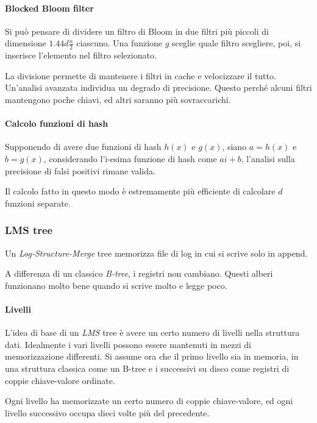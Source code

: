 \paragraph{Blocked Bloom filter}
Si può pensare di dividere un filtro di Bloom in due filtri più piccoli di dimensione $1.44d\frac{n}{2}$ ciascuno.
Una funzione $g$ sceglie quale filtro scegliere, poi, si inserisce l'elemento nel filtro selezionato.

La divisione permette di mantenere i filtri in cache e velocizzare il tutto. 
Un'analisi avanzata individua un degrado di precisione. Questo perché alcuni filtri 
mantengono poche chiavi, ed altri saranno più sovraccarichi.

\paragraph{Calcolo funzioni di hash}
Supponendo di avere due funzioni di hash $h(x)$ e $g(x)$, siano $a = h(x)$ e 
$b = g(x)$, considerando l'i-esima funzione di hash come $ai + b$, 
l'analisi sulla precisione di falsi positivi rimane valida. 
\begin{remark}
    Il calcolo fatto in questo modo è estremamente più efficiente di calcolare 
    $d$ funzioni separate. 
\end{remark}

\subsubsection{LMS tree}
Un \emph{Log-Structure-Merge} tree memorizza file di log in cui si scrive solo in append. 

A differenza di un classico \emph{B-tree}, i registri non cambiano.
Questi alberi funzionano molto bene quando si scrive molto e legge poco.

\paragraph{Livelli}
L'idea di base di un \emph{LMS} tree è avere un certo numero di livelli nella struttura 
dati. Idealmente i vari livelli possono essere mantenuti in mezzi di memorizzazione 
differenti. 
Si assume ora che il primo livello sia in memoria, in una struttura classica 
come un B-tree e i successivi su disco come registri di coppie chiave-valore ordinate. 

Ogni livello ha memorizzate un certo numero di coppie chiave-valore, ed ogni livello successivo occupa 
dieci volte più del precedente. 

